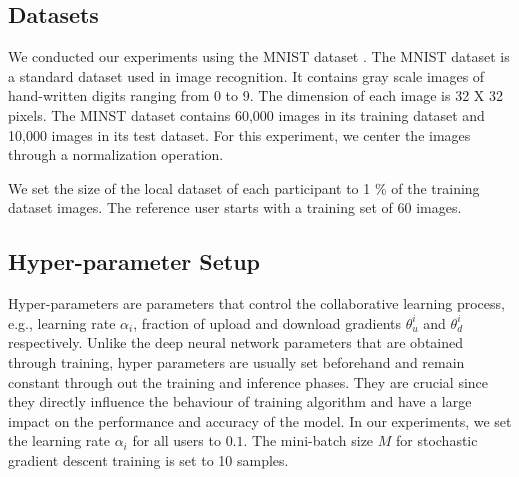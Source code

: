 \documentclass[conference]{IEEEtran}
\begin{document}



\subsection{Datasets}
We conducted our experiments using the MNIST dataset \cite{deng2012mnist}. The MNIST dataset is a standard dataset used in image
recognition. It contains gray scale images of hand-written digits ranging from 0 to 9. The dimension of each image is 32 X 32 pixels.
The MINST dataset contains 60,000 images in its training dataset and 10,000 images in its test dataset.
For this experiment, we center the images through a normalization operation.  

We set the size of the local dataset of each participant to 1 \% of the training dataset images.  The reference user starts with a
training set of 60 images.


\subsection{Hyper-parameter Setup}


Hyper-parameters are parameters that control the collaborative learning process, e.g., learning rate $\alpha_i$, fraction of upload and
download gradients $\theta^i_u$ and $\theta^i_d$ respectively. Unlike the deep neural network parameters that are obtained through
training, hyper parameters are usually set beforehand and remain constant through out the training and inference phases. They are
crucial since they directly influence the behaviour of training algorithm and have a large impact on the performance and accuracy of the
model. In our experiments, we set the learning rate $\alpha_i$ for all users to $0.1$.  The mini-batch size $M$ for stochastic gradient
descent training is set to 10 samples.
\end{document}
